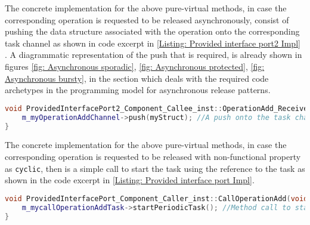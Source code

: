 The concrete implementation for the above pure-virtual methods, in case the corresponding operation is requested to be released asynchronously, consist of pushing the data structure associated with the operation onto the corresponding task channel as shown in code excerpt in \cref{Listing: Provided interface port2 Impl} . A diagrammatic representation of the push that is required, is already shown in figures \cref{fig: Asynchronous sporadic}, \cref{fig: Asynchronous protected}, \cref{fig: Asynchronous bursty}, in the section which deals with the required code archetypes in the programming model for asynchronous release patterns.

\begin{Listing}
\begin{lstlisting}[language=C++]
void ProvidedInterfacePort2_Component_Callee_inst::OperationAdd_Receiver (General::OperationAddStruct_InterfaceB myStruct) {
	m_myOperationAddChannel->push(myStruct); //A push onto the task channel
}
\end{lstlisting}
\caption{Code excerpt from the generated code for operation \texttt{OperationAdd} access in \texttt{Provided\allowbreak Interface\allowbreak Port2\_\allowbreak Component\_\allowbreak Callee\_\allowbreak inst} which is called asynchronously}
\label{Listing: Provided interface port2 Impl}
\end{Listing}

The concrete implementation for the above pure-virtual methods, in case the corresponding operation is requested to be released with non-functional property as \texttt{cyclic}, then is a simple call to start the task using the reference to the task as shown in the code excerpt in \cref{Listing: Provided interface port Impl}.

\begin{Listing}
\begin{lstlisting}[language=C++]
void ProvidedInterfacePort_Component_Caller_inst::CallOperationAdd(void) {
	m_mycallOperationAddTask->startPeriodicTask(); //Method call to start the task
}
\end{lstlisting}
\caption{Code excerpt from the generated code for operation \texttt{CallOperationAdd} in \texttt{Provided\allowbreak Interface\allowbreak Port\_\allowbreak Component\_\allowbreak Caller\_\allowbreak inst} which has non-functional property set as \texttt{Cyclic}}
\label{Listing: Provided interface port Impl}
\end{Listing}

